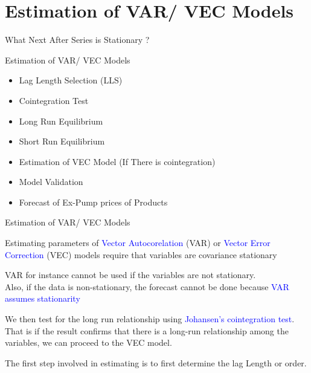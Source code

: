 \documentclass{beamer}
\newcommand{\colorPrimary}{blue}
\newcommand{\textPrimary}[1]{\textcolor{\colorPrimary}{#1}}
\newcommand{\vspaceFive}{\vspace{5pt}}
\newcommand{\VARHighlight}{\textPrimary{Vector Autocorelation }}
\newcommand{\VECHighlight}{\textPrimary{Vector Error Correction }}
\begin{document}
	\section{Estimation of VAR/ VEC Models}
	\begin{frame}{What Next After Series is Stationary ?}
		
		\begin{block}{Estimation of VAR/ VEC Models}
			\vspaceFive
			\begin{itemize}[label=$\diamond$, leftmargin=2em, itemsep=1em]
				\item Lag Length Selection (LLS)
				\item Cointegration Test
				\item Long Run Equilibrium
				\item Short Run Equilibrium
				\item Estimation of VEC Model (If There is cointegration)
				\item Model Validation
				\item Forecast of Ex-Pump prices of Products
			\end{itemize}
			\vspaceFive
		\end{block}
		
	\end{frame}
	
	
	
	\begin{frame}{Estimation of VAR/ VEC Models}
		\begin{block}{}
			Estimating parameters of \VARHighlight (VAR) or \VECHighlight (VEC) models require that variables are 
			covariance stationary \vspaceFive
		\end{block} \vspaceFive
		
		\begin{block}{}
			VAR for instance cannot be used if the variables are not stationary. \\
			Also, if the data is non-stationary, the forecast cannot be done because \textPrimary{VAR assumes stationarity}
		\end{block}
		
		\begin{block}{}
			We then test for the long run relationship using \textPrimary{Johansen’s cointegration test}.  \\
			That is if the result confirms that there is a long-run relationship among the variables, 
			we can proceed to the VEC model. 
		\end{block}
		
		\begin{exampleblock}{}
			The first step involved in estimating is to first determine the lag Length or order. 
		\end{exampleblock}
	\end{frame}
	
\end{document}
